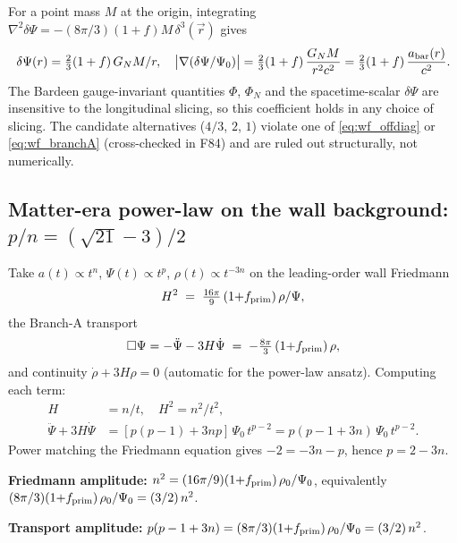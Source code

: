 \documentclass[aps,prd,twocolumn,nofootinbib,floatfix,superscriptaddress]{revtex4-2}
\begin{document}
For a point mass $M$ at the origin, integrating
$\nabla^2\delta\Psi = -(8\pi/3)(1+f) M\,\delta^3(\vec r)$
gives
\begin{equation}
\delta\Psi(r) = \tfrac{2}{3}(1+f)\,G_N M / r,
\quad
\bigl|\nabla(\delta\Psi/\Psi_0)\bigr| = \tfrac{2}{3}(1+f)\,
\frac{G_N M}{r^2 c^2} = \tfrac{2}{3}(1+f)\,
\frac{a_{\rm bar}(r)}{c^2}.
\end{equation}
The Bardeen gauge-invariant quantities $\Phi$, $\Phi_N$ and the
spacetime-scalar $\delta\Psi$ are insensitive to the longitudinal
slicing, so this coefficient holds in any choice of slicing. The
candidate alternatives ($4/3$, $2$, $1$) violate one of
\eqref{eq:wf_offdiag} or \eqref{eq:wf_branchA} (cross-checked in
F84) and are ruled out structurally, not numerically.

\subsection{Matter-era power-law on the wall background:
$p/n = (\sqrt{21}-3)/2$}
\label{app:pn}

Take $a(t) \propto t^n$, $\Psi(t) \propto t^p$, $\rho(t)
\propto t^{-3n}$ on the leading-order wall Friedmann
\begin{equation}
\label{eq:wallA}
H^2 \;=\; \tfrac{16\pi}{9}\,(1{+}f_{\rm prim})\,\rho/\Psi,
\end{equation}
the Branch-A transport
\begin{equation}
\label{eq:transportA}
\Box\Psi = -\ddot\Psi - 3H\dot\Psi
       \;=\; -\tfrac{8\pi}{3}\,(1{+}f_{\rm prim})\,\rho,
\end{equation}
and continuity $\dot\rho + 3H\rho = 0$ (automatic for the power-law
ansatz). Computing each term:
\begin{align}
H &= n/t, \quad H^2 = n^2/t^2, \\
\ddot\Psi + 3H\dot\Psi &= [p(p-1) + 3np]\,\Psi_0\,t^{p-2}
                       = p(p-1+3n)\,\Psi_0\,t^{p-2}.
\end{align}
Power matching the Friedmann equation gives $-2 = -3n - p$, hence
$p = 2 - 3n$.

\textbf{Friedmann amplitude:}
$n^2 = (16\pi/9)(1{+}f_{\rm prim})\,\rho_0/\Psi_0$, equivalently
$(8\pi/3)(1{+}f_{\rm prim})\,\rho_0/\Psi_0 = (3/2)\,n^2$.

\textbf{Transport amplitude:}
$p(p-1+3n) = (8\pi/3)(1{+}f_{\rm prim})\,\rho_0/\Psi_0
= (3/2)\,n^2$.
\end{document}
